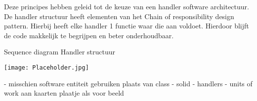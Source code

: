\whitespace[2]
Deze principes hebben geleid tot de keuze van een handler software architectuur.
De handler structuur heeft elementen van het Chain of responsibility design pattern.
Hierbij heeft elke handler 1 functie waar die aan voldoet.
Hierdoor blijft de code makkelijk te begrijpen en beter onderhoudbaar.

\begin{graphic}
    \captionsetup{type=figure}
    \caption{Sequence diagram Handler structuur}
    \texttt{[image: Placeholder.jpg]}
    \label{fig:SequenceDiagramHandlerStructure}
\end{graphic}
\whitespace
- misschien software entiteit gebruiken plaats van class
- solid
- handlers
- units of work aan kaarten
plaatje als voor beeld

